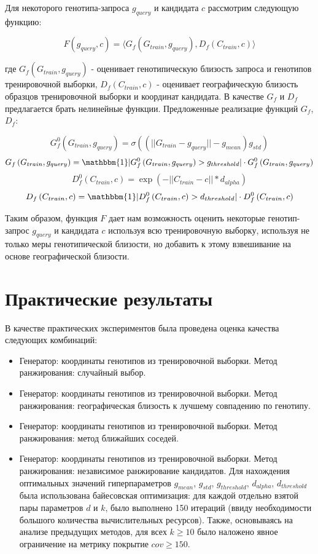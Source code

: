 \begin{itemize}
Для некоторого генотипа-запроса $g_{query}$ и кандидата $c$ рассмотрим следующую функцию:

$$ F \left( g_{query}, c\right) = \langle G_{f} \left( G_{train}, g_{query}\right), D_{f} \left( C_{train}, c\right) \rangle $$

где $G_{f} \left( G_{train}, g_{query}\right)$ - оценивает генотипическую близость запроса и генотипов тренировочной выборки, $D_{f} \left( C_{train}, c\right)$ -
оценивает географическую близость образцов тренировочной выборки и координат кандидата. В качестве $G_{f}$ и $D_{f}$ предлагается брать нелинейные функции.
Предложенные реализацие функций $G_{f}$, $D_{f}$:

$$ G^0_{f} \left( G_{train}, g_{query}\right) = \sigma \left( \left( || G_{train} - g_{query} || - g_{mean} \right) g_{std} \right) $$
$$ G_{f} \left( G_{train}, g_{query}\right) =  \mathbbm{1} | G^0_{f} \left( G_{train}, g_{query}\right) > g_{threshold} | \cdot  G^0_{f} \left( G_{train}, g_{query}\right)$$
$$ D^0_{f} \left( C_{train}, c\right) =  \exp \left( - || C_{train} - c || * d_{alpha}\right)$$
$$ D_{f} \left( C_{train}, c\right) =  \mathbbm{1} | D^0_{f} \left( C_{train}, c\right) > d_{threshold} | \cdot  D^0_{f} \left( C_{train}, c\right) $$

Таким образом, функция $F$ дает нам возможность оценить некоторые генотип-запрос $g_{query}$ и кандидата $c$
используя всю тренировочную выборку, используя не только меры генотипической близости, но добавить к этому взвешивание
на основе географической близости.
\end{itemize}

\section{Практические результаты}

В качестве практических экспериментов была проведена оценка качества следующих комбинаций:
\begin{itemize}
\item Генератор: координаты генотипов из тренировочной выборки. Метод ранжирования: случайный выбор.

\item Генератор: координаты генотипов из тренировочной выборки. Метод ранжирования:
географическая близость к лучшему совпадению по генотипу.

\item Генератор: координаты генотипов из тренировочной выборки. Метод ранжирования: метод ближайших соседей.

\item Генератор: координаты генотипов из тренировочной выборки. Метод ранжирования: независимое ранжирование кандидатов.
Для нахождения оптимальных значений гиперпараметров $g_{mean}$, $g_{std}$, $g_{threshold}$, $d_{alpha}$, $d_{threshold}$
была использована байесовская оптимизация: для каждой отдельно взятой пары параметров $d$ и $k$, было выполнено 150 итераций (ввиду необходимости большого количества
вычислительных ресурсов). Также, основываясь на анализе предыдущих методов, для всех $k \ge 10$ было наложено явное ограничение на метрику покрытие $cov \ge 150$.
\end{itemize}

